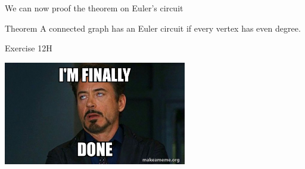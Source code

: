 \documentclass[
	11pt, %
]{beamer}
\begin{document}
\begin{frame}[t]
    We can now proof the theorem on Euler's circuit\\
    \begin{block}{Theorem}
        A connected graph has an Euler circuit if every vertex has even degree.
    \end{block}
\end{frame}
\begin{frame}
\end{frame}

\begin{frame}{Exercise 12H}
\end{frame}

\begin{frame}
    \begin{center}
        \includegraphics[width=8cm]{Done.jpg}
    \end{center}
\end{frame}
\end{document}
